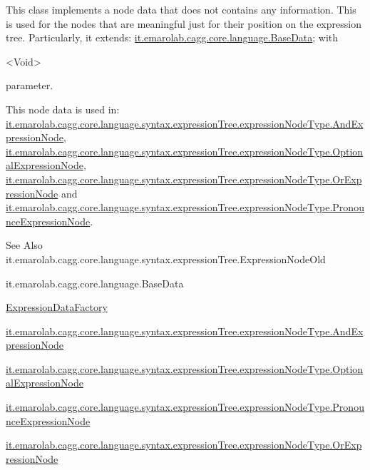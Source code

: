 This class implements a node data that does not contains any information. This is used for the nodes that are meaningful just for their position on the expression tree. Particularly, it extends\-: \hyperlink{}{it.\-emarolab.\-cagg.\-core.\-language.\-Base\-Data}; with
\begin{DoxyCode}
<Void> 
\end{DoxyCode}
 parameter.\par
 This node data is used in\-: \hyperlink{classit_1_1emarolab_1_1cagg_1_1core_1_1language_1_1syntax_1_1expressionTree_1_1expressionNodeType_1_1AndExpressionNode}{it.\-emarolab.\-cagg.\-core.\-language.\-syntax.\-expression\-Tree.\-expression\-Node\-Type.\-And\-Expression\-Node}, \hyperlink{classit_1_1emarolab_1_1cagg_1_1core_1_1language_1_1syntax_1_1expressionTree_1_1expressionNodeType_1_1OptionalExpressionNode}{it.\-emarolab.\-cagg.\-core.\-language.\-syntax.\-expression\-Tree.\-expression\-Node\-Type.\-Optional\-Expression\-Node}, \hyperlink{classit_1_1emarolab_1_1cagg_1_1core_1_1language_1_1syntax_1_1expressionTree_1_1expressionNodeType_1_1OrExpressionNode}{it.\-emarolab.\-cagg.\-core.\-language.\-syntax.\-expression\-Tree.\-expression\-Node\-Type.\-Or\-Expression\-Node} and \hyperlink{classit_1_1emarolab_1_1cagg_1_1core_1_1language_1_1syntax_1_1expressionTree_1_1expressionNodeType_1_1PronounceExpressionNode}{it.\-emarolab.\-cagg.\-core.\-language.\-syntax.\-expression\-Tree.\-expression\-Node\-Type.\-Pronounce\-Expression\-Node}. 

\begin{DoxySeeAlso}{See Also}
it.\-emarolab.\-cagg.\-core.\-language.\-syntax.\-expression\-Tree.\-Expression\-Node\-Old 

it.\-emarolab.\-cagg.\-core.\-language.\-Base\-Data 

\hyperlink{classit_1_1emarolab_1_1cagg_1_1core_1_1language_1_1syntax_1_1expressionTree_1_1ExpressionDataFactory}{Expression\-Data\-Factory} 

\hyperlink{classit_1_1emarolab_1_1cagg_1_1core_1_1language_1_1syntax_1_1expressionTree_1_1expressionNodeType_1_1AndExpressionNode}{it.\-emarolab.\-cagg.\-core.\-language.\-syntax.\-expression\-Tree.\-expression\-Node\-Type.\-And\-Expression\-Node} 

\hyperlink{classit_1_1emarolab_1_1cagg_1_1core_1_1language_1_1syntax_1_1expressionTree_1_1expressionNodeType_1_1OptionalExpressionNode}{it.\-emarolab.\-cagg.\-core.\-language.\-syntax.\-expression\-Tree.\-expression\-Node\-Type.\-Optional\-Expression\-Node} 

\hyperlink{classit_1_1emarolab_1_1cagg_1_1core_1_1language_1_1syntax_1_1expressionTree_1_1expressionNodeType_1_1PronounceExpressionNode}{it.\-emarolab.\-cagg.\-core.\-language.\-syntax.\-expression\-Tree.\-expression\-Node\-Type.\-Pronounce\-Expression\-Node} 

\hyperlink{classit_1_1emarolab_1_1cagg_1_1core_1_1language_1_1syntax_1_1expressionTree_1_1expressionNodeType_1_1OrExpressionNode}{it.\-emarolab.\-cagg.\-core.\-language.\-syntax.\-expression\-Tree.\-expression\-Node\-Type.\-Or\-Expression\-Node} 
\end{DoxySeeAlso}


